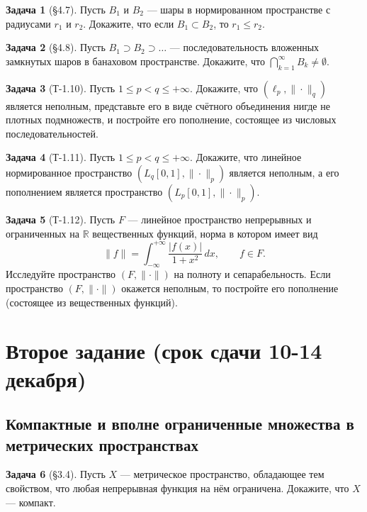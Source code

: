 \documentclass{article}
\theoremstyle{definition}
\newtheorem{problem}{Задача}
\newcommand{\R}{\mathbb R}
\begin{document}
\begin{problem}[\S 4.7]
Пусть $B_1$ и $B_2$ --- шары в нормированном пространстве с радиусами $r_1$ и $r_2$.
Докажите, что если $B_1 \subset B_2$, то $r_1 \le r_2$.
\end{problem}

\begin{problem}[\S 4.8]
Пусть $B_1 \supset B_2 \supset \ldots$ --- последовательность вложенных замкнутых шаров в банаховом пространстве. Докажите, что $\bigcap_{k=1}^\infty B_k \ne \emptyset$.
\end{problem}

\begin{problem}[Т-1.10]
Пусть $1\le p < q \le +\infty$. Докажите, что $(\ell_p, \|\cdot\|_q)$
является неполным, представьте его в виде счётного объединения нигде не плотных подмножеств, и постройте его пополнение, состоящее из числовых последовательностей.
\end{problem}

\begin{problem}[Т-1.11]
Пусть $1\le p < q \le +\infty$. Докажите, что линейное нормированное пространство $(L_q[0,1],\|\cdot\|_p)$ является неполным, а его пополнением является пространство $(L_p[0,1], \|\cdot\|_p)$.
\end{problem}

\begin{problem}[Т-1.12]
Пусть $F$ --- линейное пространство непрерывных и ограниченных на $\R$ вещественных функций, норма в котором имеет вид
\begin{equation*}
\|f\| = \int_{-\infty}^{+\infty} \frac{|f(x)|}{1+x^2} \, dx, \qquad f\in F.
\end{equation*}
Исследуйте пространство $(F,\|\cdot\|)$ на полноту и сепарабельность. Если
пространство $(F, \|\cdot\|)$ окажется неполным, то постройте его пополнение
(состоящее из вещественных функций). %
\end{problem}

\section{Второе задание (срок сдачи 10-14 декабря)}

\subsection{Компактные и вполне ограниченные множества в метрических пространствах}

\begin{problem}[\S 3.4]
Пусть $X$ --- метрическое пространство, обладающее тем свойством, что любая непрерывная функция
на нём ограничена. Докажите, что $X$ --- компакт.
\end{problem}
\end{document}
